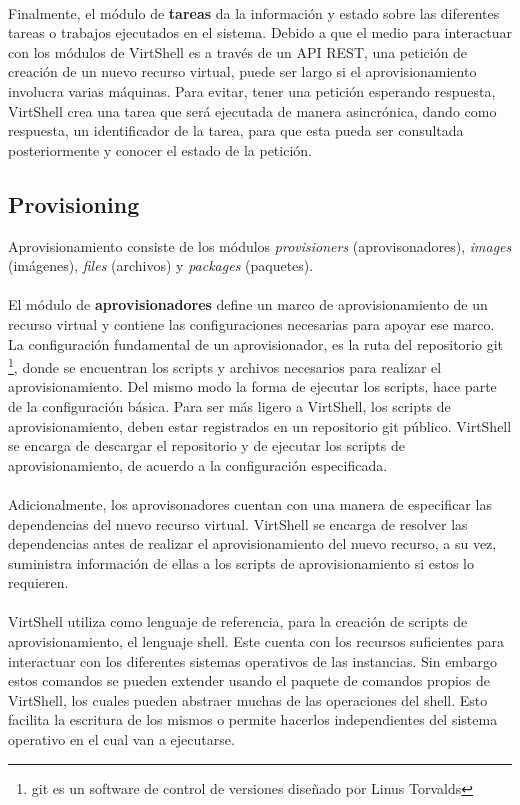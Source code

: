 \documentclass[conference, spanish]{IEEEtran}
\begin{document}
\\
Finalmente, el módulo de \textbf{tareas} da la información y estado sobre las diferentes tareas o trabajos ejecutados en el sistema. Debido a que el medio para interactuar con los módulos de VirtShell es a través de un API REST, una petición de creación de un nuevo recurso virtual, puede ser largo si el aprovisionamiento involucra varias máquinas. Para evitar, tener una petición esperando respuesta, VirtShell crea una tarea que será ejecutada de manera asincrónica, dando como respuesta, un identificador de la tarea, para que esta pueda ser consultada posteriormente y conocer el estado de la petición.


\subsection{Provisioning}
Aprovisionamiento consiste de los módulos \emph{provisioners} (aprovisonadores), \emph{images} (imágenes), \emph{files} (archivos) y \emph{packages} (paquetes).\\
\\
El módulo de \textbf{aprovisionadores} define un marco de aprovisionamiento de un recurso virtual y contiene las configuraciones necesarias para apoyar ese marco. La configuración fundamental de un aprovisionador, es la ruta del repositorio git \footnote{git es un software de control de versiones diseñado por Linus Torvalds}, donde se encuentran los scripts y archivos necesarios para realizar el aprovisionamiento. Del mismo modo la forma de ejecutar los scripts, hace parte de la configuración básica. Para ser más ligero a VirtShell, los scripts de aprovisionamiento, deben estar registrados en un repositorio git público. VirtShell se encarga de descargar el repositorio y de ejecutar los scripts de aprovisionamiento, de acuerdo a la configuración especificada. \\
\\
Adicionalmente, los aprovisonadores cuentan con una manera de especificar las dependencias del nuevo recurso virtual. VirtShell se encarga de resolver las dependencias antes de realizar el aprovisionamiento del nuevo recurso, a su vez, suministra información de ellas a los scripts de aprovisionamiento si estos lo requieren. \\
\\
VirtShell utiliza como lenguaje de referencia, para la creación de scripts de aprovisionamiento, el lenguaje shell. Este cuenta con los recursos suficientes para interactuar con los diferentes sistemas operativos de las instancias. Sin embargo estos comandos se pueden extender usando el paquete de comandos propios de VirtShell, los cuales pueden abstraer muchas de las operaciones del shell. Esto facilita la escritura de los mismos o permite hacerlos independientes del sistema operativo en el cual van a ejecutarse.\\
\end{document}
